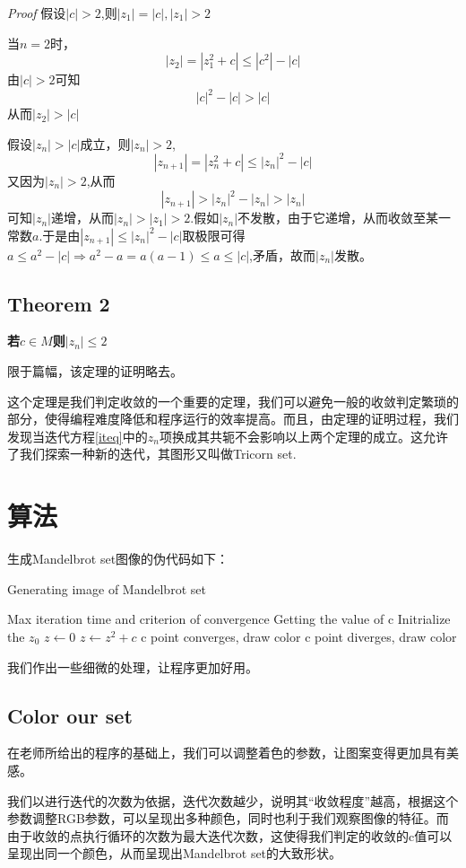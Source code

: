 \documentclass{ctexart}
\begin{document}
\textit{Proof}{} 假设$|c|>2$,则$|z_1|=|c|,|z_1|>2$\par
当$n=2$时，
$$|z_2|=|z_1^2+c|\le |c^2|-|c|$$
由$|c|>2$可知
$$|c|^2-|c|>|c|$$
从而$|z_2|>|c|$\par
假设$|z_n|>|c|$成立，则$|z_n|>2$,
$$|z_{n+1}|=|z_n^2+c|\le |z_n|^2-|c|$$
又因为$|z_n|>2$,从而
$$|z_{n+1}|>|z_n|^2-|z_n|>|z_n|$$
可知$|z_n|$递增，从而$|z_n|>|z_1|>2$.假如$|z_n|$不发散，由于它递增，从而收敛至某一常数$a$.于是由$|z_{n+1}|\le |z_n|^2-|c|$取极限可得$a\le a^2-|c|\Rightarrow a^2-a=a(a-1)\le a\le |c|$,矛盾，故而$|z_n|$发散。
\subsection{Theorem 2}
\textbf{若$c \in M$则$|z_n|\le 2$}\par
限于篇幅，该定理的证明略去。

这个定理是我们判定收敛的一个重要的定理，我们可以避免一般的收敛判定繁琐的部分，使得编程难度降低和程序运行的效率提高。而且，由定理的证明过程，我们发现当迭代方程\ref{iteq}中的$z_n$项换成其共轭不会影响以上两个定理的成立。这允许了我们探索一种新的迭代，其图形又叫做Tricorn set.
\section{算法}
生成Mandelbrot set图像的伪代码如下：
\begin{algorithm}
\caption{Generating image of Mandelbrot set}
\label{alg1}
\begin{algorithmic}
\Require Max iteration time and criterion of convergence
\State Getting the value of c
\State Initrialize the $z_0$ $z \gets 0$
\State $z \gets z^2 + c$
\EndWhile
{}
\State c point converges, draw color
\Else{} c point diverges, draw color
\EndIf
\end{algorithmic}
\end{algorithm}
我们作出一些细微的处理，让程序更加好用。
\subsection{Color our set}
在老师所给出的程序的基础上，我们可以调整着色的参数，让图案变得更加具有美感。

我们以进行迭代的次数为依据，迭代次数越少，说明其“收敛程度”越高，根据这个参数调整RGB参数，可以呈现出多种颜色，同时也利于我们观察图像的特征。而由于收敛的点执行循环的次数为最大迭代次数，这使得我们判定的收敛的c值可以呈现出同一个颜色，从而呈现出Mandelbrot set的大致形状。
\end{document}
